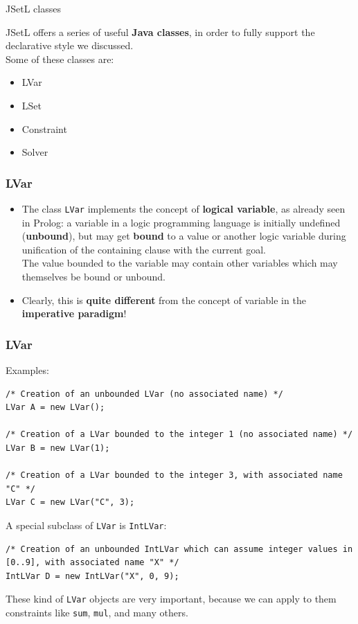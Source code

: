 \documentclass{beamer}
\begin{document}
\begin{frame}{JSetL classes}

JSetL offers a series of useful \textbf{Java classes}, in order to fully support the declarative style we discussed.\\
Some of these classes are:
\vspace{5mm}
\begin{itemize}
\setlength\itemsep{2em}
\item LVar
\item LSet
\item Constraint
\item Solver
\end{itemize}

\end{frame}



\begin{frame}[fragile]
\frametitle{LVar}
\begin{itemize}
\setlength\itemsep{3em}
\item The class \texttt{LVar} implements the concept of \textbf{logical variable}, as already seen in Prolog: a variable in a logic programming language is initially undefined (\textbf{unbound}), but may get \textbf{bound} to a value or another logic variable during unification of the containing clause with the current goal.\\
The value bounded to the variable may contain other variables which may themselves be bound or unbound.\\
\item Clearly, this is \textbf{quite different} from the concept of variable in the \textbf{imperative paradigm}!\\

\end{itemize}
\end{frame}

\begin{frame}[fragile]
\frametitle{LVar}
Examples:\\

\begin{lstlisting}
/* Creation of an unbounded LVar (no associated name) */
LVar A = new LVar();

/* Creation of a LVar bounded to the integer 1 (no associated name) */
LVar B = new LVar(1);

/* Creation of a LVar bounded to the integer 3, with associated name "C" */
LVar C = new LVar("C", 3);
\end{lstlisting}

A special subclass of \texttt{LVar} is \texttt{IntLVar}:
\begin{lstlisting}
/* Creation of an unbounded IntLVar which can assume integer values in [0..9], with associated name "X" */
IntLVar D = new IntLVar("X", 0, 9);
\end{lstlisting}
These kind of \texttt{LVar} objects are very important, because we can apply to them constraints like \texttt{sum}, \texttt{mul}, and many others.
\end{frame}
\end{document}
